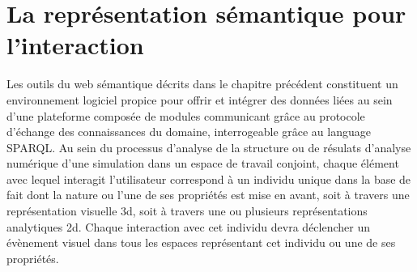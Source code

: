 \section{La représentation sémantique pour l'interaction}




Les outils du web sémantique décrits dans le chapitre précédent constituent un environnement logiciel propice pour offrir et intégrer des données liées au sein d'une plateforme composée de modules communicant grâce au protocole d'échange des connaissances du domaine, interrogeable grâce au language SPARQL. %
Au sein du processus d'analyse de la structure ou de résulats d'analyse numérique d'une simulation dans un espace de travail conjoint, chaque élément avec lequel interagit l'utilisateur correspond à un individu unique dans la base de fait dont la nature ou l'une de ses propriétés est mise en avant, soit à travers une représentation visuelle 3d, soit à travers une ou plusieurs représentations analytiques 2d. Chaque interaction avec cet individu devra déclencher un évènement visuel dans tous les espaces représentant cet individu ou une de ses propriétés.

